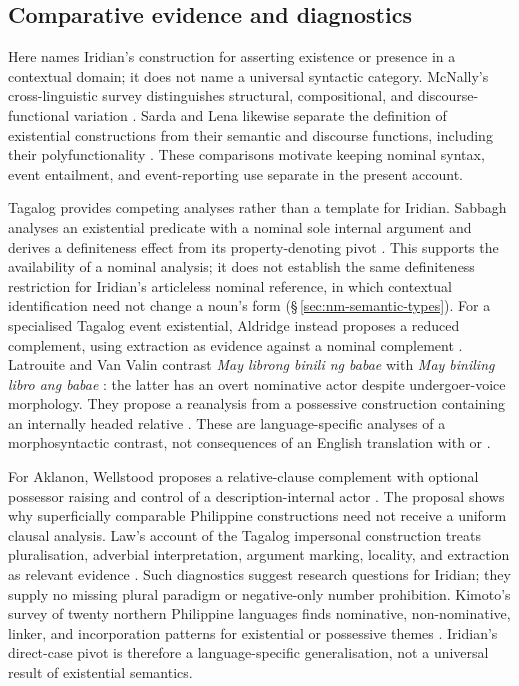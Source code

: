 \subsection{Comparative evidence and diagnostics}
\label{sec:exst-comparison}

Here  names Iridian's construction for asserting existence
or presence in a contextual domain; it does not name a universal syntactic
category. McNally's cross-linguistic survey distinguishes structural,
compositional, and discourse-functional variation \cite{mcnally2016existential}.
Sarda and Lena likewise separate the definition of existential constructions
from their semantic and discourse functions, including their polyfunctionality
\cite{sardalena2023}. These comparisons motivate keeping nominal syntax, event
entailment, and event-reporting use separate in the present account.

Tagalog provides competing analyses rather than a template for Iridian.
Sabbagh analyses an existential predicate with a nominal sole internal
argument and derives a definiteness effect from its property-denoting pivot
\cite{sabbagh2009}. This supports the availability of a nominal analysis;
it does not establish the same definiteness restriction for Iridian's
articleless nominal reference, in which contextual identification need not
change a noun's form (§\,\ref{sec:nm-semantic-types}). For a specialised Tagalog event
existential, Aldridge instead proposes a reduced  complement,
using extraction as evidence against a nominal complement
\cite{aldridge2011event}. Latrouite and Van Valin contrast
\textit{May librong binili ng babae} 
with \textit{May biniling libro ang babae} :
the latter has an overt nominative actor despite undergoer-voice morphology.
They propose a reanalysis from a possessive construction containing an
internally headed relative \cite{latrouitevanvalin2014event}. These are
language-specific analyses of a morphosyntactic contrast, not consequences
of an English translation with  or .

For Aklanon, Wellstood proposes a relative-clause complement with optional
possessor raising and control of a description-internal actor
\cite{wellstood2022}. The proposal shows why superficially comparable
Philippine constructions need not receive a uniform clausal analysis.
Law's account of the Tagalog impersonal construction treats pluralisation,
adverbial interpretation, argument marking, locality, and extraction as
relevant evidence \cite{law2010impersonal}. Such diagnostics suggest research
questions for Iridian; they supply no missing plural paradigm or negative-only
number prohibition. Kimoto's survey of twenty northern Philippine languages
finds nominative, non-nominative, linker, and incorporation patterns for
existential or possessive themes \cite{kimoto2026existential}. Iridian's
direct-case pivot is therefore a language-specific generalisation, not a
universal result of existential semantics.

